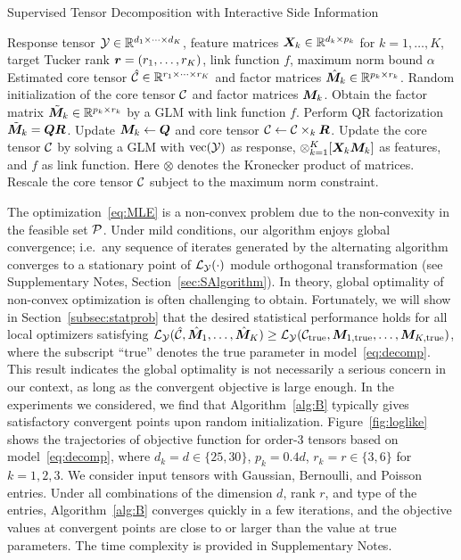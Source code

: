 \documentclass[12pt]{article}
\theoremstyle{definition}
\theoremstyle{definition}
\begin{document}
\begin{algorithm}[!h]
\caption{Supervised Tensor Decomposition with Interactive Side Information}\label{alg:B}
\begin{algorithmic}[1]
\INPUT Response tensor $\mathcal{Y}\in \mathbb{R}^{d_1\times \cdots \times d_K}$, feature matrices $\bm X_k\in\mathbb{R}^{d_k\times p_k}$ for $k=1,\ldots,K$, target Tucker rank $\bm{r}=(r_1,\ldots,r_K)$, link function $f$, maximum norm bound $\alpha$
\OUTPUT Estimated core tensor $\hat {\mathcal{C}}\in\mathbb{R}^{r_1\times \cdots \times r_K}$ and factor matrices $\hat {\bm M}_k\in\mathbb{R}^{p_k\times r_k}$. 
\State Random initialization of the core tensor $\mathcal{C}$ and factor matrices $\bm M_k$. 
\State Obtain the factor matrix $\tilde {\bm M}_k\in\mathbb{R}^{p_k\times r_k}$ by a GLM with link function $f$.
\State Perform QR factorization $\tilde {\bm M}_k=\bm{Q}\bm{R}$.
\State Update $\bm M_k\leftarrow \bm{Q}$ and core tensor $\mathcal{C}\leftarrow \mathcal{C}\times_k \bm{R}$.
\EndFor
\State Update the core tensor $\mathcal{C}$ by solving a GLM with $\textup{vec}(\mathcal{Y})$ as response, $\otimes_{k=1}^K[ \bm X_k\bm M_k]$ as features, and $f$ as link function. Here $\otimes$ denotes the Kronecker product of matrices. 
\State Rescale the core tensor $\mathcal{C}$ subject to the maximum norm constraint. 
\EndWhile
\end{algorithmic}
\end{algorithm}

The optimization~\eqref{eq:MLE} is a non-convex problem due to the non-convexity in the feasible set $\mathcal{P}$. Under mild conditions, our algorithm enjoys global convergence; i.e.\ any sequence of iterates generated by the alternating algorithm converges to a stationary point of $\mathcal{L}_{\mathcal{Y}}(\cdot)$ module orthogonal transformation (see Supplementary Notes, Section~\ref{sec:SAlgorithm}). In theory, global optimality of non-convex optimization is often challenging to obtain. Fortunately, we will show in Section~\ref{subsec:statprob} that the desired statistical performance holds for all local optimizers satisfying $\mathcal{L}_{\mathcal{Y}}(\hat {\mathcal{C}}, \hat {\bm M}_1,\ldots,\hat {\bm M}_K)\geq \mathcal{L}_{\mathcal{Y}} (\mathcal{C}_{\textup{true}},\bm M_{1,\textup{true}},\ldots,\bm M_{K,\textup{true}})$, where the subscript ``true'' denotes the true parameter in model~\eqref{eq:decomp}. This result indicates the global optimality is not necessarily a serious concern in our context, as long as the convergent objective is large enough. In the experiments we considered, we find that Algorithm~\ref{alg:B} typically gives satisfactory convergent points upon random initialization. Figure~\ref{fig:loglike} shows the trajectories of objective function for order-3 tensors based on model~\eqref{eq:decomp}, where $d_k = d \in\{25,30\}$, $p_k = 0.4d$, $r_k = r\in\{3,6\}$ for $ k = 1,2,3$. We consider input tensors with Gaussian, Bernoulli, and Poisson entries. Under all combinations of the dimension $d$, rank $r$, and type of the entries, Algorithm~\ref{alg:B} converges quickly in a few iterations, and the objective values at convergent points are close to or larger than the value at true parameters.  The time complexity is provided in Supplementary Notes. 
\end{document}
